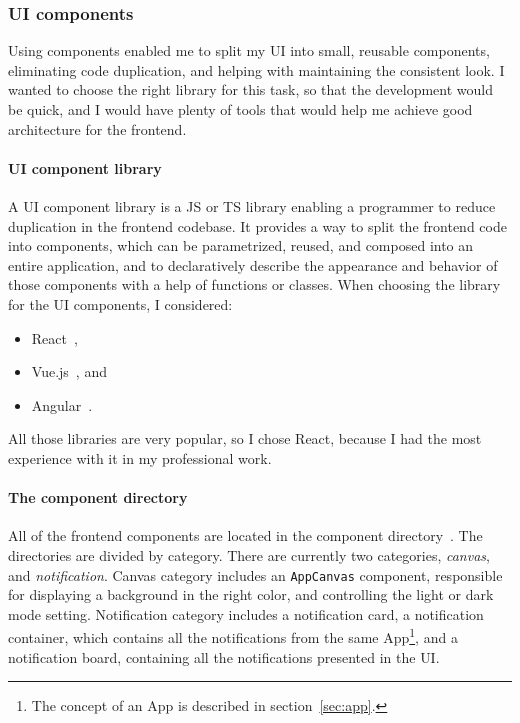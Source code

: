 \subsubsection{UI components}\label{sec:ui-components}

Using components enabled me to split my \ac{UI}
into small, reusable components,
eliminating code duplication,
and helping with maintaining the consistent look.
I wanted to choose the right library
for this task,
so that the development would be quick,
and I would have plenty of tools
that would help me achieve
good architecture for the frontend.

\paragraph*{UI component library}\label{sec:ui-component-library}

A \ac{UI} component library is a \acf{JS} or \acf{TS} library
enabling a programmer to reduce duplication
in the frontend codebase.
It provides a way to split the frontend code into components,
which can be parametrized, reused, and composed into an entire application,
and to declaratively describe
the appearance and behavior of those components
with a help of functions or classes.
When choosing the library for the \ac{UI} components, I considered:

\begin{itemize}
  \item
        React~\cite{oshannessy_react_2022},
  \item
        Vue.js~\cite{you_vuejs_2022}, and
  \item
        Angular~\cite{kalpakas_angular_2022}.
\end{itemize}

All those libraries are very popular,
so I chose React,
because I had the most experience with it in my professional work.

\paragraph*{The component directory}\label{sec:the-component-directory}

All of the frontend components
are located in the component directory~\cite{sewera_notipie_2022-3}.
The directories are divided by category.
There are currently two categories,
\textit{canvas}, and
\textit{notification}.
Canvas category includes
an \texttt{AppCanvas} component,
responsible for displaying
a background in the right color,
and controlling the light or dark mode setting.
Notification category includes
a notification card,
a notification container,
which contains all the notifications
from the same App\footnote{
  The concept of an App is described
  in section~\ref{sec:app}.
}, and a notification board,
containing all the notifications
presented in the \ac{UI}.

